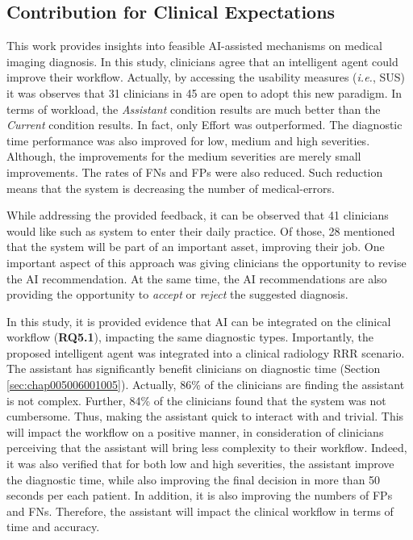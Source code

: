 \subsection{Contribution for Clinical Expectations}
\label{sec:chap005007001}

This work provides insights into feasible \ac{AI}-assisted mechanisms on medical imaging diagnosis.
In this study, clinicians agree that an intelligent agent could improve their workflow.
Actually, by accessing the usability measures ({\it i.e.}, \ac{SUS}) it was observes that 31 clinicians in 45 are open to adopt this new paradigm.
In terms of workload, the {\it Assistant} condition results are much better than the {\it Current} condition results.
In fact, only Effort was outperformed.
The diagnostic time performance was also improved for low, medium and high severities.
Although, the improvements for the medium severities are merely small improvements.
The rates of \acp{FN} and \acp{FP} were also reduced.
Such reduction means that the system is decreasing the number of medical-errors.

While addressing the provided feedback, it can be observed that 41 clinicians would like such as system to enter their daily practice.
Of those, 28 mentioned that the system will be part of an important asset, improving their job.
One important aspect of this approach was giving clinicians the opportunity to revise the \ac{AI} recommendation.
At the same time, the \ac{AI} recommendations are also providing the opportunity to {\it accept} or {\it reject} the suggested diagnosis.

In this study, it is provided evidence that \ac{AI} can be integrated on the clinical workflow ({\bf RQ5.1}), impacting the same diagnostic types.
Importantly, the proposed intelligent agent was integrated into a clinical radiology \ac{RRR} scenario.
The assistant has significantly benefit clinicians on diagnostic time (Section \ref{sec:chap005006001005}).
Actually, 86\% of the clinicians are finding the assistant is not complex.
Further, 84\% of the clinicians found that the system was not cumbersome.
Thus, making the assistant quick to interact with and trivial.
This will impact the workflow on a positive manner, in consideration of clinicians perceiving that the assistant will bring less complexity to their workflow.
Indeed, it was also verified that for both low and high severities, the assistant improve the diagnostic time, while also improving the final decision in more than 50 seconds per each patient.
In addition, it is also improving the numbers of \acp{FP} and \acp{FN}.
Therefore, the assistant will impact the clinical workflow in terms of time and accuracy.

